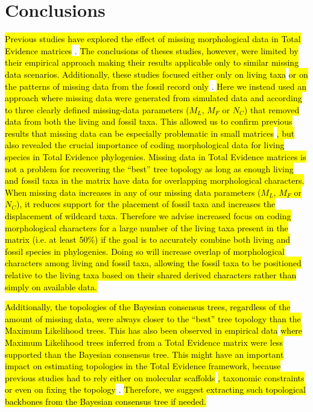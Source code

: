 \documentclass[12pt,letterpaper]{article}
\begin{document}
\section{Conclusions}
\hl{Previous studies have explored the effect of missing morphological data in Total Evidence matrices }\citep{Wiens01102005,manosphylogeny2007,pattinsonphylogeny2014}.
\hl{The conclusions of theses studies, however, were limited by their empirical approach making their results applicable only to similar missing data scenarios.
Additionally, these studies focused either only on living taxa }\citep{Wiens01102005}\hl{ or on the patterns of missing data from the fossil record only }\citep{manosphylogeny2007,pattinsonphylogeny2014}.
\hl{Here we instead used an approach where missing data were generated from simulated data and according to three clearly defined missing-data parameters ($M_{L}$, $M_{F}$ or $N_{C}$) that removed data from both the living and fossil taxa.
This allowed us to confirm previous results that missing data can be especially problematic in small matrices }\citep{wiensmissing2003}\hl{, but also revealed the crucial importance of coding morphological data for living species in Total Evidence phylogenies.
Missing data in Total Evidence matrices is not a problem for recovering the ``best'' tree topology as long as enough living and fossil taxa in the matrix have data for overlapping morphological characters.
When missing data increases in any of our missing data parameters ($M_{L}$, $M_{F}$ or $N_{C}$), it reduces support for the placement of fossil taxa and increases the displacement of wildcard taxa.
Therefore we advise increased focus on coding morphological characters for a large number of the living taxa present in the matrix (i.e. at least 50\%) if the goal is to accurately combine both living and fossil species in phylogenies.
Doing so will increase overlap of morphological characters among living and fossil taxa, allowing the fossil taxa to be positioned relative to the living taxa based on their shared derived characters rather than simply on available data.}

\hl{Additionally, the topologies of the Bayesian consensus trees, regardless of the amount of missing data, were always closer to the ``best'' tree topology than the Maximum Likelihood trees.
This has also been observed in empirical data }\citep[\hl{e.g.}][]{Arcila2015131}\hl{ where Maximum Likelihood trees inferred from a Total Evidence matrix were less supported than the Bayesian consensus tree.
This might have an important impact on estimating topologies in the Total Evidence framework, because previous studies had to rely either on molecular scaffolds }\citep[\hl{e.g.}][]{slaterphylogenetic2013}\hl{, taxonomic constraints }\citep[\hl{e.g.}][]{slaterphylogenetic2013,beckancient2014}\hl{ or even on fixing the topology }\citep[\hl{e.g.}][]{ronquista2012}.
\hl{Therefore, we suggest extracting such topological backbones from the Bayesian consensus tree if needed.} 
\end{document}
